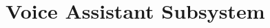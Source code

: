 \documentclass[12pt,a4paper]{report}
\begin{document}
\section{Voice Assistant Subsystem}
\label{sec:speech}







\end{document}
